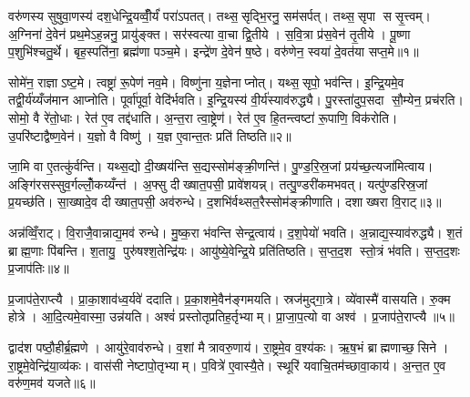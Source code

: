 

\clearpage
{}
\setcounter{anuvakam}{0}
वरु॑णस्य सुषुवा॒णस्य॑ दश॒धेन्द्रि॒यव्वीँ॒र्यं॑ परा॑ऽपतत्। तथ्स॒सृद्भि॒रनु॒ सम॑सर्पत्। तथ्स॒सृपा ससृ॒त्त्वम्। अ॒ग्निना॑ दे॒वेन॑ प्रथ॒मेऽह॒न्ननु॒ प्रायु॑ङ्क्त। सर॑स्वत्या वा॒चा द्वि॒तीये। स॒वि॒त्रा प्र॑स॒वेन॑ तृ॒तीये। पू॒ष्णा प॒शुभि॑श्चतु॒र्थे। बृह॒स्पति॑ना॒ ब्रह्म॑णा पञ्च॒मे। इन्द्रे॑ण दे॒वेन॑ ष॒ष्ठे। वरु॑णेन॒ स्वया॑ दे॒वत॑या सप्त॒मे॥१॥

सोमे॑न॒ राज्ञाऽष्ट॒मे। त्वष्ट्रा॑ रू॒पेण॑ नव॒मे। विष्णु॑ना य॒ज्ञेनाप्नोत्। यथ्स॒सृपो॒ भव॑न्ति। इ॒न्द्रि॒यमे॒व तद्वी॒र्य॑य्यँज॑मान आप्नोति। पूर्वा॑पूर्वा॒ वेदि॑र्भवति। इ॒न्द्रि॒यस्य॑ वी॒र्य॑स्याव॑रुद्ध्यै। पु॒रस्ता॑दुप॒सदा सौ॒म्येन॒ प्रच॑रति। सोमो॒ वै रे॑तो॒धाः। रेत॑ ए॒व तद्द॑धाति। अ॒न्त॒रा त्वा॒ष्ट्रेण॑। रेत॑ ए॒व हि॒तन्त्वष्टा॑ रू॒पाणि॒ विक॑रोति। उ॒परि॑ष्टाद्वैष्ण॒वेन॑। य॒ज्ञो वै विष्णु॑। य॒ज्ञ ए॒वान्त॒तः प्रति॑ तिष्ठति॥२॥\anuvakamend[स॒प्त॒मे द॑धाति॒ पञ्च॑ च]

जा॒मि वा ए॒तत्कु॑र्वन्ति। यथ्स॒द्यो दी॒ख्षय॑न्ति स॒द्यस्सोम॑ङ्क्री॒णन्ति॑। पु॒ण्ड॒रि॒स्र॒जां प्रय॑च्छ॒त्यजा॑मित्वाय। अङ्गि॑रसस्सुव॒र्गल्लोँ॒कय्यँन्त॑। अ॒फ्सु दीख्षात॒पसी॒ प्रावे॑शयन्न्। तत्पु॒ण्डरी॑कमभवत्। यत्पु॑ण्डरिस्र॒जां प्र॒यच्छ॑ति। सा॒ख्षादे॒व दीख्षात॒पसी॒ अव॑रुन्धे। द॒शभि॑र्वथ्सत॒रैस्सोम॑ङ्क्रीणाति। दशाख्षरा वि॒राट्॥३॥

अन्न॑व्विँ॒राट्। वि॒राजै॒वान्नाद्य॒मव॑ रुन्धे। मु॒ष्क॒रा भ॑वन्ति सेन्द्र॒त्वाय॑। द॒श॒पेयो॑ भवति। अ॒न्नाद्य॒स्याव॑रुद्ध्यै। श॒तं ब्राह्म॒णाः पि॑बन्ति। श॒तायु॒ पुरु॑षश्श॒तेन्द्रि॑यः। आयु॑ष्ये॒वेन्द्रि॒ये प्रति॑तिष्ठति। स॒प्त॒द॒श स्तो॒त्रं भ॑वति। स॒प्त॒द॒शः प्र॒जाप॑तिः॥४॥

प्र॒जाप॑ते॒राप्त्यै। प्रा॒का॒शाव॑ध्व॒र्यवे॑ ददाति। प्र॒का॒शमे॒वैन॑ङ्गमयति। स्रज॑मुद्गा॒त्रे। व्ये॑वास्मै॑ वासयति। रु॒क्म होत्रे। आ॒दि॒त्यमे॒वास्मा॒ उन्न॑यति। अश्वं॑ प्रस्तोतृप्रतिह॒र्तृभ्याम्। प्रा॒जा॒प॒त्यो वा अश्व॑। प्र॒जाप॑ते॒राप्त्यै॥५॥

द्वाद॑श पष्ठौ॒हीर्ब्र॒ह्मणे। आयु॑रे॒वाव॑रुन्धे। व॒शां मैत्रावरु॒णाय॑। रा॒ष्ट्रमे॒व व॒श्य॑कः। ऋ॒ष॒भं ब्राह्मणाच्छ॒सिने। रा॒ष्ट्रमे॒वेन्द्रि॑या॒व्य॑कः। वास॑सी नेष्टापो॒तृभ्याम्। प॒वित्रे॑ ए॒वास्यै॒ते। स्थूरि॑ यवाचि॒तम॑च्छावा॒काय॑। अ॒न्त॒त ए॒व वरु॑ण॒मव॑ यजते॥६॥

